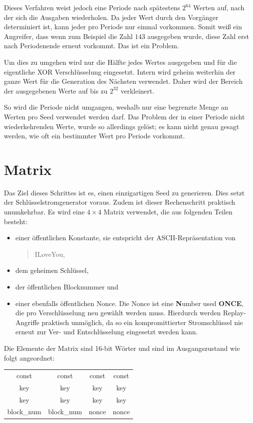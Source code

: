 \documentclass[10pt,a4paper]{article}
\begin{document}
\medskip
Dieses Verfahren weist jedoch eine Periode nach spätestens $2^{64}$ Werten auf, nach der sich die Ausgaben wiederholen.
Da jeder Wert durch den Vorgänger determiniert ist, kann jeder pro Periode nur einmal vorkommen.
Somit weiß ein Angreifer, dass wenn zum Beispiel die Zahl $143$ ausgegeben wurde, diese Zahl erst nach Periodenende erneut vorkommt.
Das ist ein Problem.

Um dies zu umgehen wird nur die Hälfte jedes Wertes ausgegeben und für die eigentliche XOR Verschlüsselung eingesetzt.
Intern wird geheim weiterhin der ganze Wert für die Generation des Nächsten verwendet.
Daher wird der Bereich der ausgegebenen Werte auf bis zu $2^{32}$ verkleinert.

So wird die Periode nicht umgangen, weshalb nur eine begrenzte Menge an Werten pro Seed verwendet werden darf.
Das Problem der in einer Periode nicht wiederkehrenden Werte, wurde so allerdings gelöst; es kann nicht genau gesagt werden, wie oft ein bestimmter Wert pro Periode vorkommt.

\section{Matrix}

Das Ziel dieses Schrittes ist es, einen einzigartigen Seed zu generieren.
Dies setzt der Schlüsselstromgenerator voraus.
Zudem ist dieser Rechenschritt praktisch unumkehrbar.
Es wird eine $4 \times 4$ Matrix verwendet, die aus folgenden Teilen besteht:
\begin{itemize}
    \item einer öffentlichen Konstante, sie entspricht der ASCII-Repräsentation von
          \begin{quotation}
              \glqq ILoveYou\grqq{},
          \end{quotation}
    \item dem geheimen Schlüssel,
    \item der öffentlichen Blocknummer und
    \item einer ebenfalls öffentlichen Nonce.
          Die Nonce ist eine \glqq \textbf{N}umber used \textbf{ONCE}\grqq{}, die pro Verschlüsselung neu gewählt werden muss.
          Hierdurch werden Replay-Angriffe praktisch unmöglich, da so ein kompromittierter Stromschlüssel nie erneut zur Ver- und Entschlüsselung eingesetzt werden kann.
\end{itemize}

Die Elemente der Matrix sind 16-bit Wörter und sind im Ausgangszustand wie folgt angeordnet:
\begin{center}
    \begin{tabular}{ c c c c }
        const      & const      & const & const \\
        key        & key        & key   & key   \\
        key        & key        & key   & key   \\
        block\_num & block\_num & nonce & nonce \\
    \end{tabular}
\end{center}
\end{document}
